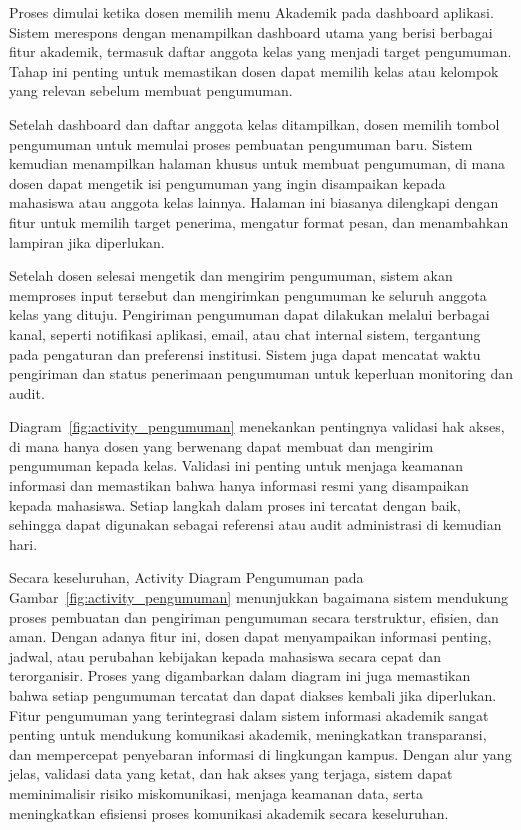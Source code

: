 \documentclass[a4paper,oneside,11pt]{book}
\begin{document}
Proses dimulai ketika dosen memilih menu Akademik pada dashboard aplikasi. Sistem merespons dengan menampilkan dashboard utama yang berisi berbagai fitur akademik, termasuk daftar anggota kelas yang menjadi target pengumuman. Tahap ini penting untuk memastikan dosen dapat memilih kelas atau kelompok yang relevan sebelum membuat pengumuman.

Setelah dashboard dan daftar anggota kelas ditampilkan, dosen memilih tombol pengumuman untuk memulai proses pembuatan pengumuman baru. Sistem kemudian menampilkan halaman khusus untuk membuat pengumuman, di mana dosen dapat mengetik isi pengumuman yang ingin disampaikan kepada mahasiswa atau anggota kelas lainnya. Halaman ini biasanya dilengkapi dengan fitur untuk memilih target penerima, mengatur format pesan, dan menambahkan lampiran jika diperlukan.

Setelah dosen selesai mengetik dan mengirim pengumuman, sistem akan memproses input tersebut dan mengirimkan pengumuman ke seluruh anggota kelas yang dituju. Pengiriman pengumuman dapat dilakukan melalui berbagai kanal, seperti notifikasi aplikasi, email, atau chat internal sistem, tergantung pada pengaturan dan preferensi institusi. Sistem juga dapat mencatat waktu pengiriman dan status penerimaan pengumuman untuk keperluan monitoring dan audit.

Diagram~\ref{fig:activity_pengumuman} menekankan pentingnya validasi hak akses, di mana hanya dosen yang berwenang dapat membuat dan mengirim pengumuman kepada kelas. Validasi ini penting untuk menjaga keamanan informasi dan memastikan bahwa hanya informasi resmi yang disampaikan kepada mahasiswa. Setiap langkah dalam proses ini tercatat dengan baik, sehingga dapat digunakan sebagai referensi atau audit administrasi di kemudian hari.

Secara keseluruhan, Activity Diagram Pengumuman pada Gambar~\ref{fig:activity_pengumuman} menunjukkan bagaimana sistem mendukung proses pembuatan dan pengiriman pengumuman secara terstruktur, efisien, dan aman. Dengan adanya fitur ini, dosen dapat menyampaikan informasi penting, jadwal, atau perubahan kebijakan kepada mahasiswa secara cepat dan terorganisir. Proses yang digambarkan dalam diagram ini juga memastikan bahwa setiap pengumuman tercatat dan dapat diakses kembali jika diperlukan. Fitur pengumuman yang terintegrasi dalam sistem informasi akademik sangat penting untuk mendukung komunikasi akademik, meningkatkan transparansi, dan mempercepat penyebaran informasi di lingkungan kampus. Dengan alur yang jelas, validasi data yang ketat, dan hak akses yang terjaga, sistem dapat meminimalisir risiko miskomunikasi, menjaga keamanan data, serta meningkatkan efisiensi proses komunikasi akademik secara keseluruhan.
\end{document}
